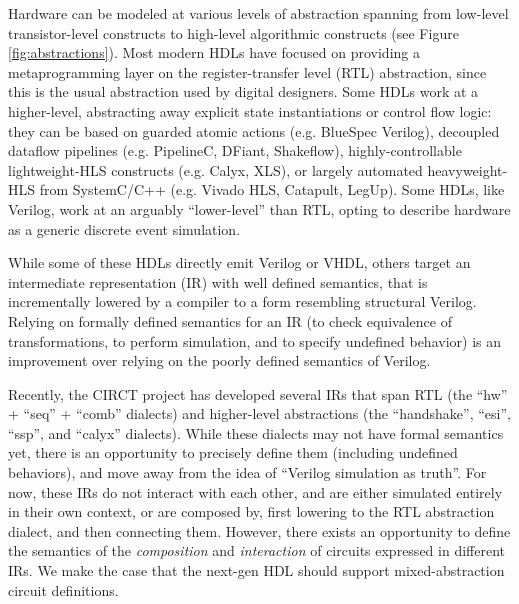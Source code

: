 \documentclass[sigplan,review,nonacm]{acmart}
\begin{document}

Hardware can be modeled at various levels of abstraction spanning from low-level transistor-level constructs to high-level algorithmic constructs (see Figure \ref{fig:abstractions}).
Most modern HDLs have focused on providing a metaprogramming layer on the register-transfer level (RTL) abstraction, since this is the usual abstraction used by digital designers.
Some HDLs work at a higher-level, abstracting away explicit state instantiations or control flow logic: they can be based on guarded atomic actions (e.g. BlueSpec Verilog\cite{bluespecverilog}), decoupled dataflow pipelines (e.g. PipelineC\cite{pipelinec}, DFiant\cite{dfiant}, Shakeflow\cite{shakeflow}), highly-controllable lightweight-HLS constructs (e.g. Calyx\cite{calyx}, XLS\cite{xls}), or largely automated heavyweight-HLS from SystemC/C++ (e.g. Vivado HLS, Catapult, LegUp\cite{legup}).
Some HDLs, like Verilog, work at an arguably ``lower-level'' than RTL, opting to describe hardware as a generic discrete event simulation.


While some of these HDLs directly emit Verilog or VHDL, others target an intermediate representation (IR) with well defined semantics, that is incrementally lowered by a compiler to a form resembling structural Verilog.
Relying on formally defined semantics for an IR (to check equivalence of transformations, to perform simulation\cite{hwsemantics}, and to specify undefined behavior) is an improvement\cite{cider} over relying on the poorly defined semantics of Verilog.


Recently, the CIRCT project\cite{circt} has developed several IRs that span RTL (the ``hw'' + ``seq'' + ``comb'' dialects) and higher-level abstractions (the ``handshake'', ``esi'', ``ssp'', and ``calyx''\cite{calyx} dialects).
While these dialects may not have formal semantics yet, there is an opportunity to precisely define them (including undefined behaviors), and move away from the idea of ``Verilog simulation as truth''.
For now, these IRs do not interact with each other, and are either simulated entirely in their own context, or are composed by, first lowering to the RTL abstraction dialect, and then connecting them.
However, there exists an opportunity to define the semantics of the \textit{composition} and \textit{interaction} of circuits expressed in different IRs.
We make the case that the next-gen HDL should support mixed-abstraction circuit definitions.
\end{document}
